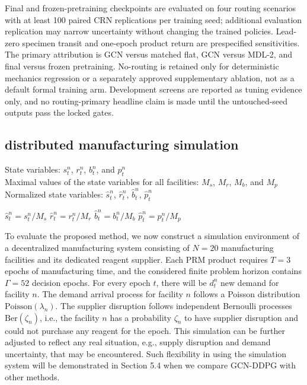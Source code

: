 \documentclass[preprint,review,12pt]{elsarticle}
\begin{document}
Final and frozen-pretraining checkpoints are evaluated on four routing
scenarios with at least 100 paired CRN replications per training seed;
additional evaluation replication may narrow uncertainty without changing the
trained policies. Lead-zero specimen transit and one-epoch product return are
prespecified sensitivities. The primary attribution is GCN versus matched
flat, GCN versus MDL-2, and final versus frozen pretraining. No-routing is
retained only for deterministic mechanics regression or a separately approved
supplementary ablation, not as a default formal training arm. Development
screens are reported as tuning evidence only, and no routing-primary headline
claim is made until the untouched-seed outputs pass the locked gates.
\subsection{distributed manufacturing simulation}
\begin{algorithm}
\caption{State normalization}
\begin{algorithmic}[1]
\Require State variables: $s_t^n$, $r_t^n$, $b_t^n$, and $p_t^n$ \\
         Maximal values of the state variables for all facilities: $M_s$, $M_r$, $M_b$, and $M_p$
\Ensure Normalized state variables: $\hat{s}_t^n$, $\hat{r}_t^n$, $\hat{b}_t^n$, $\hat{p}_t^n$

    \State $\hat{s}_t^n = s_t^n / M_s$
    \State $\hat{r}_t^n = r_t^n / M_r$
    \State $\hat{b}_t^n = b_t^n / M_b$
    \State $\hat{p}_t^n = p_t^n / M_p$
\EndFor
\end{algorithmic}
\end{algorithm}

To evaluate the proposed method, we now construct a simulation environment of a decentralized manufacturing system consisting of $N=20$ manufacturing facilities and its dedicated reagent supplier. Each PRM product requires $T=3$ epochs of manufacturing time, and the considered finite problem horizon contains $\Gamma=52$ decision epochs. For every epoch $t$, there will be $d_{t}^{n}$ new demand for facility $n$. The demand arrival process for facility $n$ follows a Poisson distribution $\text{Poisson}\left(\lambda_{n}\right)$. The supplier disruption follows independent Bernoulli processes $\text{Ber}\left(\zeta_{n}\right)$, i.e., the facility $n$ has a probability $\zeta_{n}$ to have supplier disruption and could not purchase any reagent for the epoch. This simulation can be further adjusted to reflect any real situation, e.g., supply disruption and demand uncertainty, that may be encountered. Such flexibility in using the simulation system will be demonstrated in Section 5.4 when we compare GCN-DDPG with other methods.
\end{document}
